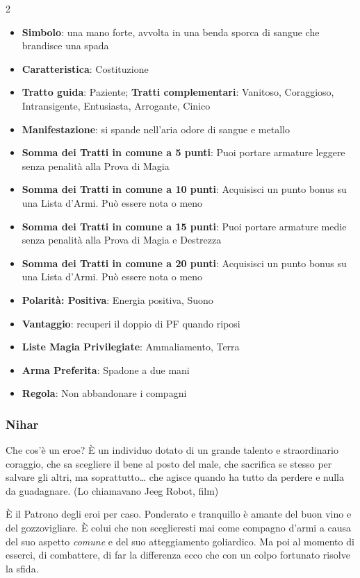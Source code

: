 \begin{multicols}{2}
\begin{itemize}[leftmargin=*] \setlength{\itemsep}{0pt}
\item \textbf{Simbolo}: una mano forte, avvolta in una benda sporca di sangue che brandisce una spada
\item \textbf{Caratteristica}: Costituzione
\item \textbf{Tratto guida}: Paziente; \textbf{Tratti complementari}: Vanitoso, Coraggioso, Intransigente, Entusiasta, Arrogante, Cinico
\item \textbf{Manifestazione}: si spande nell'aria odore di sangue e metallo
\item \textbf{Somma dei Tratti in comune a 5 punti}: Puoi portare armature leggere senza penalità alla Prova di Magia
\item \textbf{Somma dei Tratti in comune a 10 punti}: Acquisisci un punto bonus su una Lista d'Armi. Può essere nota o meno
\item \textbf{Somma dei Tratti in comune a 15 punti}: Puoi portare armature medie senza penalità alla Prova di Magia e Destrezza
\item \textbf{Somma dei Tratti in comune a 20 punti}: Acquisisci un punto bonus su una Lista d'Armi. Può essere nota o meno
\item \textbf{Polarità: Positiva}: Energia positiva, Suono
\item \textbf{Vantaggio}: recuperi il doppio di PF quando riposi
\item \textbf{Liste Magia Privilegiate}: Ammaliamento, Terra
\item \textbf{Arma Preferita}: Spadone a due mani
\item \textbf{Regola}: Non abbandonare i compagni
\end{itemize}

\subsubsection{Nihar}\label{nihar}\hypertarget{nihar}{}

\begin{enfasi}{
Che cos'è un eroe? È un individuo dotato di un grande talento e straordinario coraggio, che sa scegliere il bene al posto del male, che sacrifica se stesso per salvare gli altri, ma soprattutto… che agisce quando ha tutto da perdere e nulla da guadagnare. (Lo chiamavano Jeeg Robot, film)
}\end{enfasi}

È il Patrono degli eroi per caso. Ponderato e tranquillo è amante del buon vino e del gozzovigliare. È colui che non sceglieresti mai come compagno d'armi a causa del suo aspetto \emph{comune} e del suo atteggiamento goliardico. Ma poi al momento di esserci, di combattere, di far la differenza ecco che con un colpo fortunato risolve la sfida.


\end{multicols}
